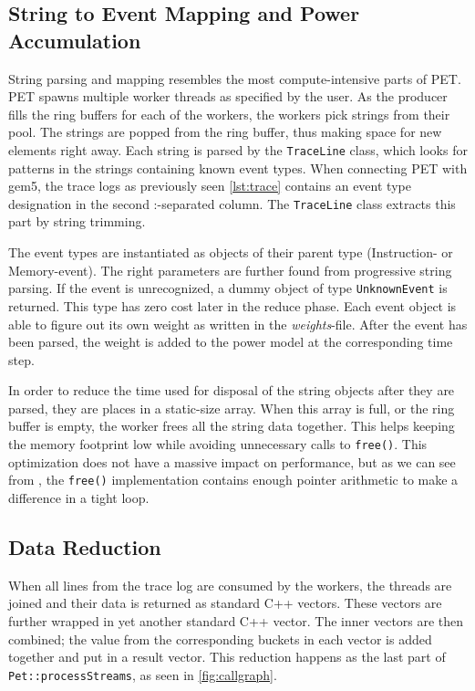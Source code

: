 \subsection{String to Event Mapping and Power Accumulation}

String parsing and mapping resembles the most compute-intensive parts of PET.
PET spawns multiple worker threads as specified by the user. As the producer
fills the ring buffers for each of the workers, the workers pick strings from
their pool. The strings are popped from the ring buffer, thus making space for
new elements right away. Each string is parsed by the \texttt{TraceLine} class,
which looks for patterns in the strings containing known event types. When
connecting PET with gem5, the trace logs as previously seen \autoref{lst:trace}
contains an event type designation in the second :-separated column. The
\texttt{TraceLine} class extracts this part by string trimming.

The event types are instantiated as objects of their parent type (Instruction-
or Memory-event). The right parameters are further found from progressive string
parsing. If the event is unrecognized, a dummy object of type
\texttt{UnknownEvent} is returned. This type has zero cost later in the reduce
phase. Each event object is able to figure out its own weight as written in the
\emph{weights}-file. After the event has been parsed, the weight is added to the
power model at the corresponding time step.

In order to reduce the time used for disposal of the string objects after they
are parsed, they are places in a static-size array. When this array is full, or
the ring buffer is empty, the worker frees all the string data together. This
helps keeping the memory footprint low while avoiding unnecessary calls to
\texttt{free()}. This optimization does not have a massive impact on
performance, but as we can see from \cite{kernighan1988c}, the \texttt{free()}
implementation contains enough pointer arithmetic to make a difference in a
tight loop.


\subsection{Data Reduction}

When all lines from the trace log are consumed by the workers, the threads are
joined and their data is returned as standard C++ vectors. These vectors are
further wrapped in yet another standard C++ vector. The inner vectors are then
combined; the value from the corresponding buckets in each vector is added
together and put in a result vector. This reduction happens as the last part
of \texttt{Pet::processStreams}, as seen in \autoref{fig:callgraph}.

